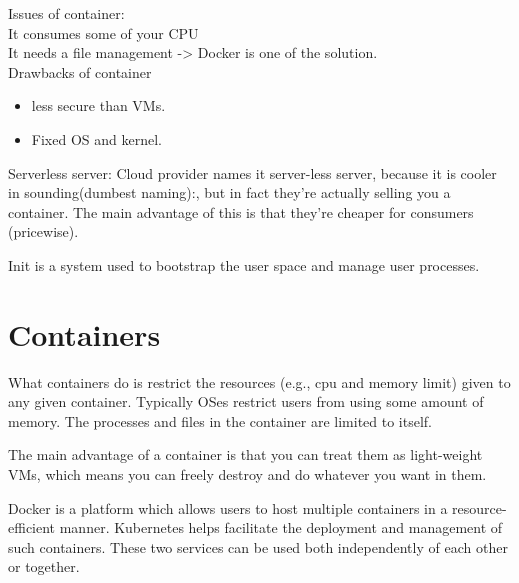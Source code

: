 \documentclass[fancy,11pt,titlestyle=display]{style/elegantbook}
\begin{document}
Issues of container:\\
It consumes some of your CPU\\
It needs a file management -> Docker is one of the solution.\\

Drawbacks of container
\begin{itemize}
    \item less secure than VMs.
    \item Fixed OS and kernel.
\end{itemize}

Serverless server: Cloud provider names it server-less server, because it is cooler in sounding(dumbest naming):, but in fact they're actually selling you a container. The main advantage of this is that they're cheaper for consumers (pricewise).\\

\par Init is a system used to bootstrap the user space and manage user processes.





\section{Containers}

\par What containers do is restrict the resources (e.g., cpu and memory limit) given to any given container. Typically OSes restrict users from using some amount of memory. The processes and files in the container are limited to itself.

\par The main advantage of a container is that you can treat them as light-weight VMs, which means you can freely destroy and do whatever you want in them.

\begin{note}
Docker is a platform which allows users to host multiple containers in a resource-efficient manner. Kubernetes helps facilitate the deployment and management of such containers. These two services can be used both independently of each other or together.
\end{note}
\end{document}
